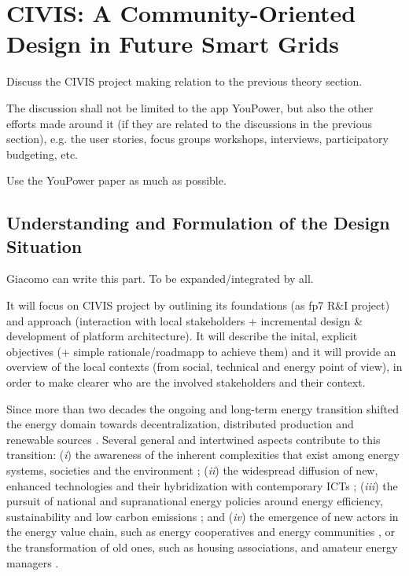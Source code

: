 \section{CIVIS: A Community-Oriented Design in Future Smart Grids}

\begin{svgraybox}
Discuss the CIVIS project making relation to the previous theory section. 

The discussion shall not be limited to the app YouPower, but also the other efforts made around it 
(if they are related to the discussions in the previous section), e.g. the user stories, focus 
groups workshops, interviews, participatory budgeting, etc. 

Use the YouPower paper as much as possible. 
\end{svgraybox}


\subsection{Understanding and Formulation of the Design Situation}
\begin{svgraybox}
[note by GP] Giacomo can write this part. To be expanded/integrated by all.

It will focus on CIVIS project by outlining its foundations (as fp7 R\&I project) and approach 
(interaction with local stakeholders + incremental design \& development of platform architecture). 
It will describe the inital, explicit objectives (+ simple rationale/roadmapp to achieve them) and 
it will provide an overview of the local contexts (from social, technical and energy point of view), 
in order to make clearer who are the involved stakeholders and their context.
\end{svgraybox}

Since more than two decades the ongoing and long-term energy transition shifted the energy domain
towards decentralization, distributed production and renewable sources \cite{rifkin_third_2011,sovacool_how_2016}. Several general and intertwined aspects contribute to this transition: 
(\textit{i}) the awareness of the inherent complexities that exist among energy systems, societies 
and the environment \cite{bulkeley_bringing_2012,umbach_global_2010}; (\textit{ii}) the
widespread diffusion of new, enhanced technologies and their hybridization with contemporary ICTs 
\cite{putrus_smart_2013,schick_innovating_2013}; (\textit{iii}) the pursuit of national and 
supranational energy policies around energy efficiency, sustainability and low carbon emissions 
\cite{da_graca_carvalho_eu_2012}; and (\textit{iv}) the emergence of new actors in the energy value 
chain, such as energy cooperatives and energy communities \cite{viardot_role_2013}, or the 
transformation of old ones, such as housing associations, and amateur energy managers 
\cite{hasselqvist_linking_2016}.


